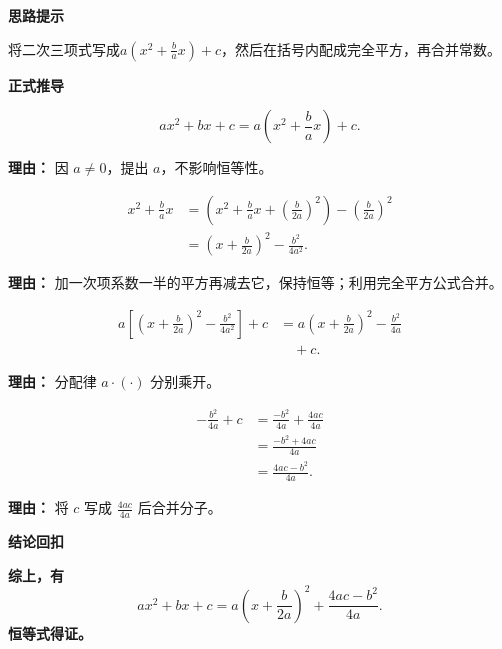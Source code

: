 \begin{proofbox}
	\textbf{\textcolor{CProof}{思路提示}}

	将二次三项式写成$a(x^2+\frac{b}{a}x)+c$，然后在括号内配成完全平方，再合并常数。

	\medskip
	\textbf{\textcolor{CProof}{正式推导}}
	\begin{description}[style=nextline, leftmargin=2.8em, labelsep=0.5em, itemsep=0.55em]
		\item[\textbf{步骤一（提取系数）：}]
			\[
				ax^2+bx+c = a\left(x^2+\frac{b}{a}x\right)+c.
			\]
			\par\textbf{理由：} 因 $a\neq 0$，提出 $a$，不影响恒等性。

		\item[\textbf{步骤二（括号配方）：}]
			\[
				\begin{aligned}
					x^2+\frac{b}{a}x
					&= \left(x^2+\frac{b}{a}x + \left(\frac{b}{2a}\right)^2\right) - \left(\frac{b}{2a}\right)^2 \\
					&= \left(x+\frac{b}{2a}\right)^2 - \frac{b^2}{4a^2}.
			\end{aligned}
			\]
			\par\textbf{理由：} 加一次项系数一半的平方再减去它，保持恒等；利用完全平方公式合并。

		\item[\textbf{步骤三（乘以系数）：}]
			\[
				\begin{aligned}
					a\left[\left(x+\frac{b}{2a}\right)^2-\frac{b^2}{4a^2}\right]+c
					&= a\left(x+\frac{b}{2a}\right)^2 - \frac{b^2}{4a} \\
					&\quad +c.
			\end{aligned}
			\]
			\par\textbf{理由：} 分配律 $a\cdot\left(\cdot\right)$ 分别乘开。

		\item[\textbf{步骤四（合并常数）：}]
			\[
				\begin{aligned}
					-\frac{b^2}{4a}+c
					&= \frac{-b^2}{4a} + \frac{4ac}{4a} \\
					&= \frac{-b^2+4ac}{4a} \\
					&= \frac{4ac-b^2}{4a}.
			\end{aligned}
			\]
			\par\textbf{理由：} 将 $c$ 写成 $\frac{4ac}{4a}$ 后合并分子。
	\end{description}

	\medskip
	\textbf{\textcolor{CProof}{结论回扣}}

	\textbf{综上，有}
	\[
		ax^2+bx+c = a\left(x+\frac{b}{2a}\right)^2+\frac{4ac-b^2}{4a}.
	\]
	\textbf{恒等式得证。}
\end{proofbox}
